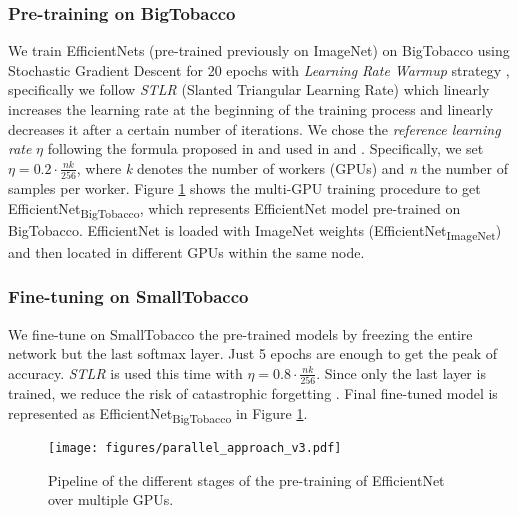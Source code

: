 \documentclass[runningheads]{llncs}
\begin{document}
\subsubsection{Pre-training on BigTobacco}

We train EfficientNets (pre-trained previously on ImageNet) on BigTobacco using Stochastic Gradient Descent for 20 epochs with \textit{Learning Rate Warmup} strategy \cite{bag_tricks}, specifically we follow \textit{STLR} (Slanted Triangular Learning Rate) \cite{ulmfit} which linearly increases the learning rate at the beginning of the training process and linearly decreases it after a certain number of iterations. We chose the \textit{reference learning rate} $\eta$ following the formula proposed in \cite{1_hour} and used in \cite{15_min} and \cite{bag_tricks}. Specifically, we set $\eta = 0.2 \cdot \frac{nk}{256}$, where \textit{k} denotes the number of workers (GPUs) and \textit{n} the number of samples per worker. Figure \ref{fig:parallel_approach} shows the multi-GPU training procedure to get EfficientNet\textsubscript{BigTobacco}, which represents EfficientNet model pre-trained on BigTobacco. EfficientNet is loaded with ImageNet weights (EfficientNet\textsubscript{ImageNet}) and then located in different GPUs within the same node.

\subsubsection{Fine-tuning on SmallTobacco}\label{fine-tune}

We fine-tune on SmallTobacco the pre-trained models by freezing the entire network but the last softmax layer. Just 5 epochs are enough to get the peak of accuracy. \textit{STLR} is used this time with $\eta = 0.8 \cdot \frac{nk}{256}$. Since only the last layer is trained, we reduce the risk of catastrophic forgetting \cite{catastrofic}. Final fine-tuned model is represented as EfficientNet\textsubscript{BigTobacco} in Figure \ref{fig:parallel_approach}.

\begin{figure}[H]
	\begin{centering}
	\texttt{[image: figures/parallel\_approach\_v3.pdf]}
	\caption{Pipeline of the different stages of the pre-training of EfficientNet over multiple GPUs.}
	\label{fig:parallel_approach}
	\end{centering}
\end{figure}
\end{document}
